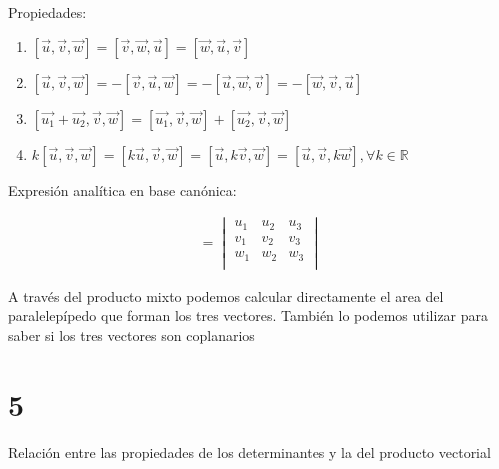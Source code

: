 \documentclass[
	12pt, %
	spanish, %
]{fphw}
\newcommand{\vu}{\vec{u}}
\newcommand{\vv}{\vec{v}}
\newcommand{\vw}{\vec{w}}
\begin{document}
Propiedades:

\begin{enumerate}
	\item $[\vu,\vv,\vw] = [\vv,\vw,\vu] = [\vw,\vu,\vv]$
	\item $[\vu,\vv,\vw] = - [\vv,\vu,\vw] = - [\vu,\vw,\vv] = - [\vw,\vv,\vu]$
	\item $[\vec{u_1} + \vec{u_2}, \vv,\vw] = [\vec{u_1},\vv,\vw] + [\vec{u_2},\vv,\vw]$
	\item $k[\vu,\vv,\vw] = [k\vu,\vv,\vw] = [\vu,k\vv,\vw] = [\vu,\vv,k\vw], \forall k \in \mathbb{R}$
\end{enumerate}

Expresión analítica en base canónica:

\begin{gather*}
	[\vu,\vv,\vw] = 
	\begin{vmatrix}
		u_1 & u_2 & u_3\\
		v_1 & v_2 & v_3\\
		w_1 & w_2 & w_3 \\
	\end{vmatrix}
\end{gather*}

A través del producto mixto podemos calcular directamente el area del paralelepípedo que forman los tres vectores. También lo podemos utilizar para saber si los tres vectores son coplanarios

\section*{5}

\begin{problem}
	Relación entre las propiedades de los determinantes y la del producto vectorial
\end{problem}
\end{document}
